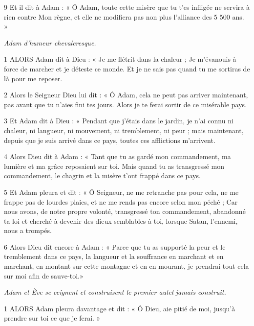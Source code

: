 \par 9 Et il dit à Adam : « Ô Adam, toute cette misère que tu t'es infligée ne servira à rien contre Mon règne, et elle ne modifiera pas non plus l'alliance des 5 500 ans. »


\par \textit{Adam d'humeur chevaleresque.}

\par 1 ALORS Adam dit à Dieu : « Je me flétrit dans la chaleur ; Je m'évanouis à force de marcher et je déteste ce monde. Et je ne sais pas quand tu me sortiras de là pour me reposer.

\par 2 Alors le Seigneur Dieu lui dit : « Ô Adam, cela ne peut pas arriver maintenant, pas avant que tu n'aies fini tes jours. Alors je te ferai sortir de ce misérable pays.

\par 3 Et Adam dit à Dieu : « Pendant que j'étais dans le jardin, je n'ai connu ni chaleur, ni langueur, ni mouvement, ni tremblement, ni peur ; mais maintenant, depuis que je suis arrivé dans ce pays, toutes ces afflictions m’arrivent.

\par 4 Alors Dieu dit à Adam : « Tant que tu as gardé mon commandement, ma lumière et ma grâce reposaient sur toi. Mais quand tu as transgressé mon commandement, le chagrin et la misère t'ont frappé dans ce pays.

\par 5 Et Adam pleura et dit : « Ô Seigneur, ne me retranche pas pour cela, ne me frappe pas de lourdes plaies, et ne me rends pas encore selon mon péché ; Car nous avons, de notre propre volonté, transgressé ton commandement, abandonné ta loi et cherché à devenir des dieux semblables à toi, lorsque Satan, l'ennemi, nous a trompés.

\par 6 Alors Dieu dit encore à Adam : « Parce que tu as supporté la peur et le tremblement dans ce pays, la langueur et la souffrance en marchant et en marchant, en montant sur cette montagne et en en mourant, je prendrai tout cela sur moi afin de sauve-toi.»


\par \textit{Adam et Ève se ceignent et construisent le premier autel jamais construit.}

\par 1 ALORS Adam pleura davantage et dit : « Ô Dieu, aie pitié de moi, jusqu'à prendre sur toi ce que je ferai. »

